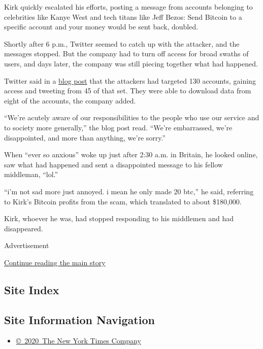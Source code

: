 Kirk quickly escalated his efforts, posting a message from accounts
belonging to celebrities like Kanye West and tech titans like Jeff
Bezos: Send Bitcoin to a specific account and your money would be sent
back, doubled.

Shortly after 6 p.m., Twitter seemed to catch up with the attacker, and
the messages stopped. But the company had to turn off access for broad
swaths of users, and days later, the company was still piecing together
what had happened.

Twitter said in a
\href{https://blog.twitter.com/en_us/topics/company/2020/an-update-on-our-security-incident.html}{blog
post} that the attackers had targeted 130 accounts, gaining access and
tweeting from 45 of that set. They were able to download data from eight
of the accounts, the company added.

``We're acutely aware of our responsibilities to the people who use our
service and to society more generally,'' the blog post read. ``We're
embarrassed, we're disappointed, and more than anything, we're sorry.''

When ``ever so anxious'' woke up just after 2:30 a.m. in Britain, he
looked online, saw what had happened and sent a disappointed message to
his fellow middleman, ``lol.''

``i'm not sad more just annoyed. i mean he only made 20 btc,'' he said,
referring to Kirk's Bitcoin profits from the scam, which translated to
about \$180,000.

Kirk, whoever he was, had stopped responding to his middlemen and had
disappeared.

Advertisement

\protect\hyperlink{after-bottom}{Continue reading the main story}

\hypertarget{site-index}{%
\subsection{Site Index}\label{site-index}}

\hypertarget{site-information-navigation}{%
\subsection{Site Information
Navigation}\label{site-information-navigation}}

\begin{itemize}
\tightlist
\item
  \href{https://help.nytimes.com/hc/en-us/articles/115014792127-Copyright-notice}{©~2020~The
  New York Times Company}
\end{itemize}

